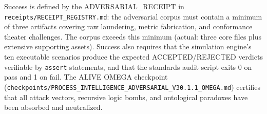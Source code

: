 Success is defined by the ADVERSARIAL\_RECEIPT in
\texttt{receipts/RECEIPT\_REGISTRY.md}: the adversarial corpus must contain a minimum of
three artifacts covering raw laundering, metric fabrication, and conformance theater
challenges. The corpus exceeds this minimum (actual: three core files plus extensive
supporting assets). Success also requires that the simulation engine's ten executable
scenarios produce the expected ACCEPTED/REJECTED verdicts verifiable by \texttt{assert}
statements, and that the standards audit script exits 0 on pass and 1 on fail. The ALIVE
OMEGA checkpoint
(\texttt{checkpoints/PROCESS\_INTELLIGENCE\_ADVERSARIAL\_V30.1.1\_OMEGA.md}) certifies that
all attack vectors, recursive logic bombs, and ontological paradoxes have been absorbed and
neutralized.
